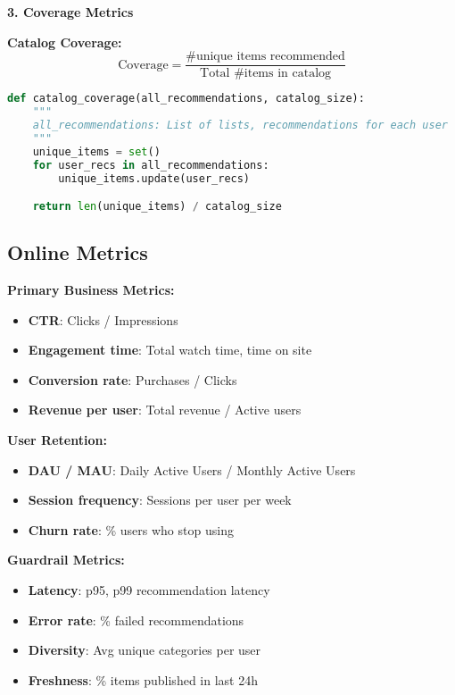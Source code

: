 \documentclass[10pt]{article}
\begin{document}
\textbf{3. Coverage Metrics}

\textbf{Catalog Coverage:}
\begin{equation}
\text{Coverage} = \frac{\text{\# unique items recommended}}{\text{Total \# items in catalog}}
\end{equation}

\begin{lstlisting}[language=Python]
def catalog_coverage(all_recommendations, catalog_size):
    """
    all_recommendations: List of lists, recommendations for each user
    """
    unique_items = set()
    for user_recs in all_recommendations:
        unique_items.update(user_recs)

    return len(unique_items) / catalog_size
\end{lstlisting}

\subsection{Online Metrics}

\textbf{Primary Business Metrics:}
\begin{itemize}
\item \textbf{CTR}: Clicks / Impressions
\item \textbf{Engagement time}: Total watch time, time on site
\item \textbf{Conversion rate}: Purchases / Clicks
\item \textbf{Revenue per user}: Total revenue / Active users
\end{itemize}

\textbf{User Retention:}
\begin{itemize}
\item \textbf{DAU / MAU}: Daily Active Users / Monthly Active Users
\item \textbf{Session frequency}: Sessions per user per week
\item \textbf{Churn rate}: \% users who stop using
\end{itemize}

\textbf{Guardrail Metrics:}
\begin{itemize}
\item \textbf{Latency}: p95, p99 recommendation latency
\item \textbf{Error rate}: \% failed recommendations
\item \textbf{Diversity}: Avg unique categories per user
\item \textbf{Freshness}: \% items published in last 24h
\end{itemize}
\end{document}
